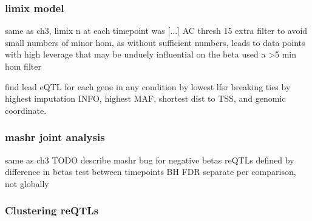 \begin{outline}


\subsubsection{limix model}

\1 same as ch3, limix
    \2 n at each timepoint was [...]
    \2 AC thresh 15
    \2 extra filter to avoid small numbers of minor hom, as without sufficient numbers, leads to data points with high leverage that may be unduely influential on the beta
    \2 used a >5 min hom filter

\1 find lead eQTL for each gene in any condition by lowest lfsr
    \2 breaking ties by highest imputation INFO, highest \gls{MAF}, shortest dist to \gls{TSS}, and genomic coordinate.

\subsubsection{mashr joint analysis}

\1 same as ch3
    \2 TODO describe mashr bug for negative betas
    \2 reQTLs defined by difference in betas test between timepoints
    \2 BH FDR separate per comparison, not globally

\subsubsection{Clustering reQTLs}



\end{outline}
